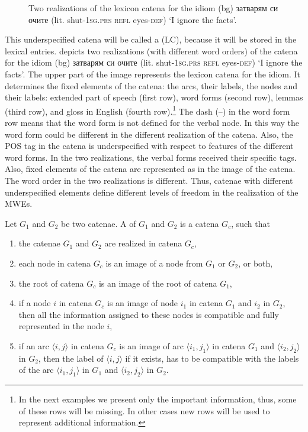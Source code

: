\documentclass[output=paper,colorlinks,citecolor=brown]{langscibook}
\begin{document}
\begin{figure}[p]
\begin{center}
  
  \caption{Two realizations of the lexicon catena for the idiom 
(bg) {затварям си очите }
(lit. shut-\textsc{1sg.prs refl} eyes-\textsc{def}) {`I ignore the facts'}.}
  \label{fig:CatenaRealization}
  \end{center}  

\end{figure}

This underspecified catena will be called a  (LC), because it will be stored in the lexical entries.  depicts two realizations (with different word orders) of the catena for the idiom  
(bg) {затварям си очите }
(lit. shut-\textsc{1sg.prs refl} eyes-\textsc{def}) {`I ignore the facts'}. 
The upper part of the image represents the lexicon catena for the idiom. It determines the fixed elements of the catena: the arcs, their labels, the nodes and their labels: extended part of speech (first row), word forms (second row), lemmas (third row), and gloss in English (fourth row).\footnote{In the next examples we present only the important information, thus, some of these rows will be missing. In other cases new rows will be used to represent additional information.} The dash (--) in the word form row means that the word form is not defined for the verbal node. In this way the word form could be different in the different realization of the catena. Also, the POS tag in the catena is underspecified with respect to features of the different word forms. In the two realizations, the verbal forms received their specific tags. Also, fixed elements of the catena are represented as in the image of the catena. The word order in the two realizations is different. Thus, catenae with different underspecified elements define different levels of freedom in the realization of the MWEs.


Let $G_1$ and $G_2$ be two catenae. A  of $G_1$ and $G_2$ is a catena $G_c$, such that

\begin{enumerate}
    \item the catenae $G_1$ and $G_2$ are realized in catena $G_c$,
    \item each node in catena $G_c$ is an image of a node from $G_1$ or $G_2$, or both,
    \item the root of catena $G_c$ is an image of the root of catena $G_1$,
    \item if a node $i$ in catena $G_c$ is an image of node $i_1$ in catena $G_1$ and $i_2$ in  $G_2$, then all the information assigned to these nodes is compatible and fully represented in the node $i$,
    \item if an arc $\langle i,j\rangle$ in catena $G_c$ is an image of arc $\langle i_1,j_1\rangle$ in catena $G_1$ and $\langle i_2,j_2\rangle$ in  $G_2$, then the label of $\langle i,j\rangle$ if it exists, has to be compatible with the labels of the arc $\langle i_1,j_1\rangle$ in $G_1$ and $\langle i_2,j_2\rangle$ in $G_2$. 
\end{enumerate}
\end{document}
